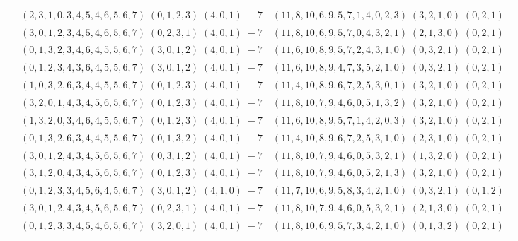 \documentclass[11pt]{article}
\begin{document}
\begin{longtable}[l]{|c|c|c|}
 \cline{2-3} 
 & $(2 ,3 ,1 ,0 ,3 ,4 ,5 ,4 ,6 ,5 ,6 ,7) \;(0 ,1 ,2 ,3) \;(4 ,0 ,1) \;-7$ & $(11 ,8 ,10 ,6 ,9 ,5 ,7 ,1 ,4 ,0 ,2 ,3) \;(3 ,2 ,1 ,0) \;(0 ,2 ,1) \;$\\ 
 \cline{2-3} 
 & $(3 ,0 ,1 ,2 ,3 ,4 ,5 ,4 ,6 ,5 ,6 ,7) \;(0 ,2 ,3 ,1) \;(4 ,0 ,1) \;-7$ & $(11 ,8 ,10 ,6 ,9 ,5 ,7 ,0 ,4 ,3 ,2 ,1) \;(2 ,1 ,3 ,0) \;(0 ,2 ,1) \;$\\ 
 \cline{2-3} 
 & $(0 ,1 ,3 ,2 ,3 ,4 ,6 ,4 ,5 ,5 ,6 ,7) \;(3 ,0 ,1 ,2) \;(4 ,0 ,1) \;-7$ & $(11 ,6 ,10 ,8 ,9 ,5 ,7 ,2 ,4 ,3 ,1 ,0) \;(0 ,3 ,2 ,1) \;(0 ,2 ,1) \;$\\ 
 \cline{2-3} 
 & $(0 ,1 ,2 ,3 ,4 ,3 ,6 ,4 ,5 ,5 ,6 ,7) \;(3 ,0 ,1 ,2) \;(4 ,0 ,1) \;-7$ & $(11 ,6 ,10 ,8 ,9 ,4 ,7 ,3 ,5 ,2 ,1 ,0) \;(0 ,3 ,2 ,1) \;(0 ,2 ,1) \;$\\ 
 \cline{2-3} 
 & $(1 ,0 ,3 ,2 ,6 ,3 ,4 ,4 ,5 ,5 ,6 ,7) \;(0 ,1 ,2 ,3) \;(4 ,0 ,1) \;-7$ & $(11 ,4 ,10 ,8 ,9 ,6 ,7 ,2 ,5 ,3 ,0 ,1) \;(3 ,2 ,1 ,0) \;(0 ,2 ,1) \;$\\ 
 \cline{2-3} 
 & $(3 ,2 ,0 ,1 ,4 ,3 ,4 ,5 ,6 ,5 ,6 ,7) \;(0 ,1 ,2 ,3) \;(4 ,0 ,1) \;-7$ & $(11 ,8 ,10 ,7 ,9 ,4 ,6 ,0 ,5 ,1 ,3 ,2) \;(3 ,2 ,1 ,0) \;(0 ,2 ,1) \;$\\ 
 \cline{2-3} 
 & $(1 ,3 ,2 ,0 ,3 ,4 ,6 ,4 ,5 ,5 ,6 ,7) \;(0 ,1 ,2 ,3) \;(4 ,0 ,1) \;-7$ & $(11 ,6 ,10 ,8 ,9 ,5 ,7 ,1 ,4 ,2 ,0 ,3) \;(3 ,2 ,1 ,0) \;(0 ,2 ,1) \;$\\ 
 \cline{2-3} 
 & $(0 ,1 ,3 ,2 ,6 ,3 ,4 ,4 ,5 ,5 ,6 ,7) \;(0 ,1 ,3 ,2) \;(4 ,0 ,1) \;-7$ & $(11 ,4 ,10 ,8 ,9 ,6 ,7 ,2 ,5 ,3 ,1 ,0) \;(2 ,3 ,1 ,0) \;(0 ,2 ,1) \;$\\ 
 \cline{2-3} 
 & $(3 ,0 ,1 ,2 ,4 ,3 ,4 ,5 ,6 ,5 ,6 ,7) \;(0 ,3 ,1 ,2) \;(4 ,0 ,1) \;-7$ & $(11 ,8 ,10 ,7 ,9 ,4 ,6 ,0 ,5 ,3 ,2 ,1) \;(1 ,3 ,2 ,0) \;(0 ,2 ,1) \;$\\ 
 \cline{2-3} 
 & $(3 ,1 ,2 ,0 ,4 ,3 ,4 ,5 ,6 ,5 ,6 ,7) \;(0 ,1 ,2 ,3) \;(4 ,0 ,1) \;-7$ & $(11 ,8 ,10 ,7 ,9 ,4 ,6 ,0 ,5 ,2 ,1 ,3) \;(3 ,2 ,1 ,0) \;(0 ,2 ,1) \;$\\ 
 \cline{2-3} 
 & $(0 ,1 ,2 ,3 ,3 ,4 ,5 ,6 ,4 ,5 ,6 ,7) \;(3 ,0 ,1 ,2) \;(4 ,1 ,0) \;-7$ & $(11 ,7 ,10 ,6 ,9 ,5 ,8 ,3 ,4 ,2 ,1 ,0) \;(0 ,3 ,2 ,1) \;(0 ,1 ,2) \;$\\ 
 \cline{2-3} 
 & $(3 ,0 ,1 ,2 ,4 ,3 ,4 ,5 ,6 ,5 ,6 ,7) \;(0 ,2 ,3 ,1) \;(4 ,0 ,1) \;-7$ & $(11 ,8 ,10 ,7 ,9 ,4 ,6 ,0 ,5 ,3 ,2 ,1) \;(2 ,1 ,3 ,0) \;(0 ,2 ,1) \;$\\ 
 \cline{2-3} 
 & $(0 ,1 ,2 ,3 ,3 ,4 ,5 ,4 ,6 ,5 ,6 ,7) \;(3 ,2 ,0 ,1) \;(4 ,0 ,1) \;-7$ & $(11 ,8 ,10 ,6 ,9 ,5 ,7 ,3 ,4 ,2 ,1 ,0) \;(0 ,1 ,3 ,2) \;(0 ,2 ,1) \;$\\ 

\end{longtable}
\end{document}
